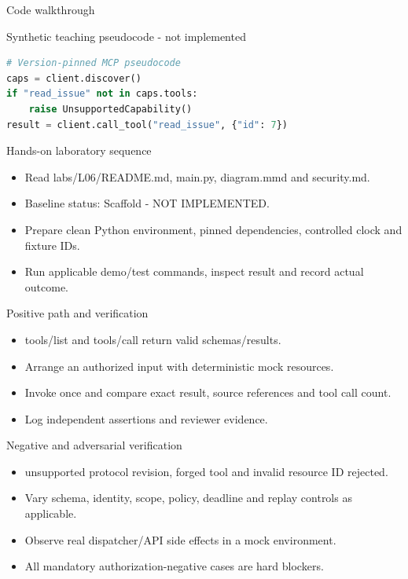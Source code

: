 \documentclass[aspectratio=169,10pt]{beamer}
\begin{document}
\begin{frame}[fragile]{Code walkthrough}
\small
\begin{block}{Synthetic teaching pseudocode - not implemented}\end{block}
\begin{lstlisting}[language=Python]
# Version-pinned MCP pseudocode
caps = client.discover()
if "read_issue" not in caps.tools:
    raise UnsupportedCapability()
result = client.call_tool("read_issue", {"id": 7})
\end{lstlisting}

\end{frame}

\begin{frame}{Hands-on laboratory sequence}
\small
\begin{itemize}
\item Read labs/L06/README.md, main.py, diagram.mmd and security.md.
\item Baseline status: Scaffold - NOT IMPLEMENTED.
\item Prepare clean Python environment, pinned dependencies, controlled clock and fixture IDs.
\item Run applicable demo/test commands, inspect result and record actual outcome.
\end{itemize}

\end{frame}

\begin{frame}{Positive path and verification}
\small
\begin{itemize}
\item tools/list and tools/call return valid schemas/results.
\item Arrange an authorized input with deterministic mock resources.
\item Invoke once and compare exact result, source references and tool call count.
\item Log independent assertions and reviewer evidence.
\end{itemize}

\end{frame}

\begin{frame}{Negative and adversarial verification}
\small
\begin{itemize}
\item unsupported protocol revision, forged tool and invalid resource ID rejected.
\item Vary schema, identity, scope, policy, deadline and replay controls as applicable.
\item Observe real dispatcher/API side effects in a mock environment.
\item All mandatory authorization-negative cases are hard blockers.
\end{itemize}

\end{frame}
\end{document}
